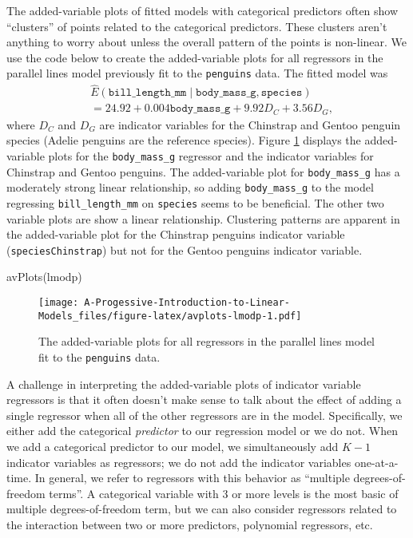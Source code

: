 \documentclass[
]{book}
\newenvironment{Shaded}{\begin{snugshade}}{\end{snugshade}}
\newcommand{\FunctionTok}[1]{\textcolor[rgb]{0.00,0.00,0.00}{#1}}
\newcommand{\NormalTok}[1]{#1}
\theoremstyle{definition}
\theoremstyle{definition}
\theoremstyle{definition}
\theoremstyle{definition}
\theoremstyle{remark}
\begin{document}
The added-variable plots of fitted models with categorical predictors
often show ``clusters'' of points related to the categorical predictors.
These clusters aren't anything to worry about unless the overall pattern
of the points is non-linear. We use the code below to create the
added-variable plots for all regressors in the parallel lines model
previously fit to the \texttt{penguins} data. The fitted model was \[
\begin{aligned}
&\hat{E}(\mathtt{bill\_length\_mm} \mid \mathtt{body\_mass\_g}, \mathtt{species})\\
&= 24.92 + 0.004 \mathtt{body\_mass\_g} + 9.92 D_C + 3.56 D_G,
\end{aligned}
\] where \(D_C\) and \(D_G\) are indicator variables for the Chinstrap and
Gentoo penguin species (Adelie penguins are the reference species).
Figure \ref{fig:avplots-lmodp} displays the added-variable plots for
the \texttt{body\_mass\_g} regressor and the indicator variables for Chinstrap
and Gentoo penguins. The added-variable plot for \texttt{body\_mass\_g} has a
moderately strong linear relationship, so adding \texttt{body\_mass\_g} to the
model regressing \texttt{bill\_length\_mm} on \texttt{species} seems to be beneficial.
The other two variable plots are show a linear relationship. Clustering
patterns are apparent in the added-variable plot for the Chinstrap
penguins indicator variable (\texttt{speciesChinstrap}) but not for the Gentoo
penguins indicator variable.

\begin{Shaded}
\begin{Highlighting}[]
\FunctionTok{avPlots}\NormalTok{(lmodp)}
\end{Highlighting}
\end{Shaded}

\begin{figure}
\centering
\texttt{[image: A-Progessive-Introduction-to-Linear-Models\_files/figure-latex/avplots-lmodp-1.pdf]}
\caption{\label{fig:avplots-lmodp}The added-variable plots for all regressors in the parallel lines model fit to the \texttt{penguins} data.}
\end{figure}

A challenge in interpreting the added-variable plots of indicator
variable regressors is that it often doesn't make sense to talk about
the effect of adding a single regressor when all of the other
regressors are in the model. Specifically, we either add the categorical
\emph{predictor} to our regression model or we do not. When we add a
categorical predictor to our model, we simultaneously add \(K-1\)
indicator variables as regressors; we do not add the indicator variables
one-at-a-time. In general, we refer to regressors with this behavior as
``multiple degrees-of-freedom terms''. A categorical variable with 3 or
more levels is the most basic of multiple degrees-of-freedom term, but
we can also consider regressors related to the interaction between
two or more predictors, polynomial regressors, etc.
\end{document}
